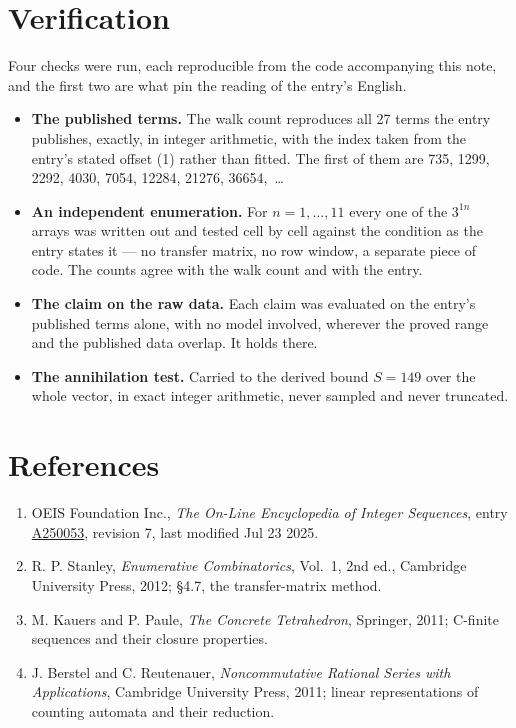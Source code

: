 \documentclass[11pt]{article}
\theoremstyle{definition}
\begin{document}
\section{Verification}

Four checks were run, each reproducible from the code accompanying this note, and the first two are what pin the reading of the entry's English.

\begin{itemize}

\item {\bfseries The published terms.} The walk count reproduces all 27 terms the entry publishes, exactly, in integer arithmetic, with the index taken from the entry's stated offset (1) rather than fitted. The first of them are 735, 1299, 2292, 4030, 7054, 12284, 21276, 36654,~\dots

\item {\bfseries An independent enumeration.} For $n = 1,\dots,11$ every one of the $3^{1n}$ arrays was written out and tested cell by cell against the condition as the entry states it --- no transfer matrix, no row window, a separate piece of code. The counts agree with the walk count and with the entry.

\item {\bfseries The claim on the raw data.} Each claim was evaluated on the entry's published terms alone, with no model involved, wherever the proved range and the published data overlap. It holds there.

\item {\bfseries The annihilation test.} Carried to the derived bound $S = 149$ over the whole vector, in exact integer arithmetic, never sampled and never truncated.

\end{itemize}

\section{References}

\begin{enumerate}

\item OEIS Foundation Inc., \emph{The On-Line Encyclopedia of Integer Sequences}, entry \href{https://oeis.org/A250053}{A250053}, revision 7, last modified Jul 23 2025.

\item R. P. Stanley, \emph{Enumerative Combinatorics}, Vol.~1, 2nd ed., Cambridge University Press, 2012; \S4.7, the transfer-matrix method.

\item M. Kauers and P. Paule, \emph{The Concrete Tetrahedron}, Springer, 2011; C-finite sequences and their closure properties.

\item J. Berstel and C. Reutenauer, \emph{Noncommutative Rational Series with Applications}, Cambridge University Press, 2011; linear representations of counting automata and their reduction.

\end{enumerate}
\end{document}
